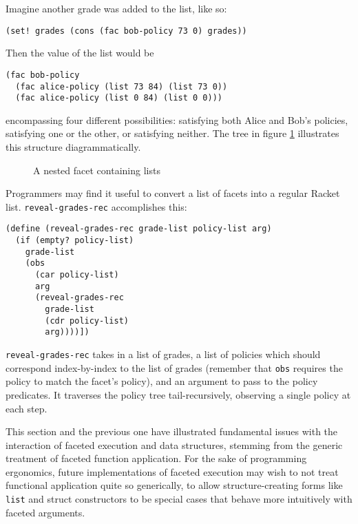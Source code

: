 \documentclass{article}
\begin{document}
Imagine another grade was added to the list, like so:

\begin{lstlisting}
(set! grades (cons (fac bob-policy 73 0) grades))
\end{lstlisting}

Then the value of the list would be

\begin{lstlisting}
(fac bob-policy
  (fac alice-policy (list 73 84) (list 73 0))
  (fac alice-policy (list 0 84) (list 0 0)))
\end{lstlisting}

\noindent encompassing four different possibilities: satisfying both Alice and Bob's policies, satisfying one or the other, or satisfying neither. The tree in figure \ref{figure:nested-list} illustrates this structure diagrammatically.

\begin{figure}[h]
\begin{center}
	\caption{A nested facet containing lists}
	\label{figure:nested-list}
\end{center}
\end{figure}

Programmers may find it useful to convert a list of facets into a regular Racket list. \texttt{reveal-grades-rec} accomplishes this:

\begin{lstlisting}
(define (reveal-grades-rec grade-list policy-list arg)
  (if (empty? policy-list)
    grade-list
    (obs
      (car policy-list)
      arg
      (reveal-grades-rec
        grade-list
        (cdr policy-list)
        arg))))])
\end{lstlisting}

\texttt{reveal-grades-rec} takes in a list of grades, a list of policies which should correspond index-by-index to the list of grades (remember that \texttt{obs} requires the policy to match the facet's policy), and an argument to pass to the policy predicates. It traverses the policy tree tail-recursively, observing a single policy at each step.

This section and the previous one have illustrated fundamental issues with the interaction of faceted execution and data structures, stemming from the generic treatment of faceted function application. For the sake of programming ergonomics, future implementations of faceted execution may wish to not treat functional application quite so generically, to allow structure-creating forms like \texttt{list} and struct constructors to be special cases that behave more intuitively with faceted arguments.
\end{document}
